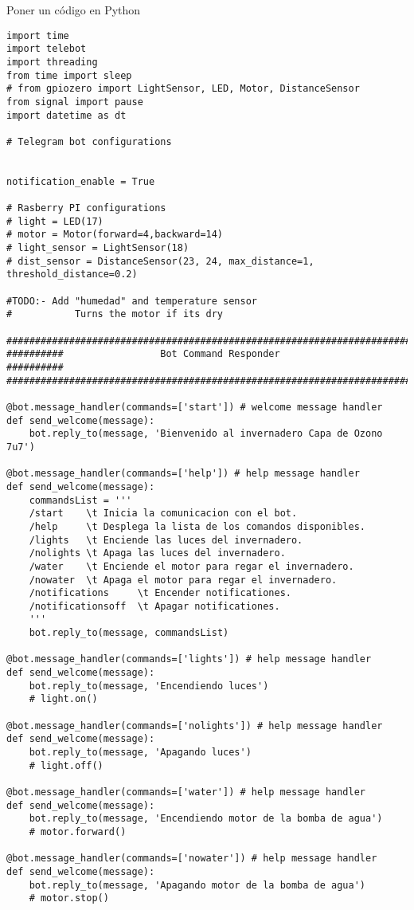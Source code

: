 \documentclass{article}
\begin{document}
Poner un c\'odigo en Python

\begin{lstlisting}
import time
import telebot
import threading
from time import sleep 
# from gpiozero import LightSensor, LED, Motor, DistanceSensor
from signal import pause
import datetime as dt

# Telegram bot configurations


notification_enable = True

# Rasberry PI configurations
# light = LED(17)
# motor = Motor(forward=4,backward=14)
# light_sensor = LightSensor(18)
# dist_sensor = DistanceSensor(23, 24, max_distance=1, threshold_distance=0.2)

#TODO:- Add "humedad" and temperature sensor
#           Turns the motor if its dry

###############################################################################
##########                 Bot Command Responder                     ##########
###############################################################################

@bot.message_handler(commands=['start']) # welcome message handler
def send_welcome(message):
    bot.reply_to(message, 'Bienvenido al invernadero Capa de Ozono 7u7')

@bot.message_handler(commands=['help']) # help message handler
def send_welcome(message):
    commandsList = '''
    /start    \t Inicia la comunicacion con el bot.
    /help     \t Desplega la lista de los comandos disponibles.
    /lights   \t Enciende las luces del invernadero.
    /nolights \t Apaga las luces del invernadero.
    /water    \t Enciende el motor para regar el invernadero.
    /nowater  \t Apaga el motor para regar el invernadero.
    /notifications     \t Encender notificationes.
    /notificationsoff  \t Apagar notificationes.
    '''
    bot.reply_to(message, commandsList)

@bot.message_handler(commands=['lights']) # help message handler
def send_welcome(message):
    bot.reply_to(message, 'Encendiendo luces')
    # light.on()

@bot.message_handler(commands=['nolights']) # help message handler
def send_welcome(message):
    bot.reply_to(message, 'Apagando luces')
    # light.off()

@bot.message_handler(commands=['water']) # help message handler
def send_welcome(message):
    bot.reply_to(message, 'Encendiendo motor de la bomba de agua')
    # motor.forward()

@bot.message_handler(commands=['nowater']) # help message handler
def send_welcome(message):
    bot.reply_to(message, 'Apagando motor de la bomba de agua')
    # motor.stop()


\end{lstlisting}
\end{document}
